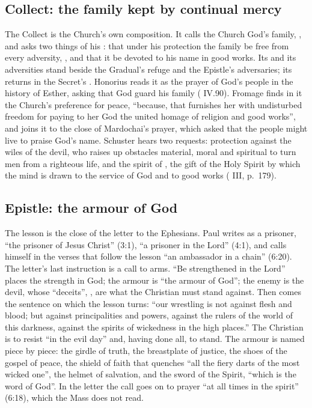 \subsection{Collect: the family kept by continual mercy}

The Collect is the Church's own composition. It calls the Church God's family,
, and asks two things of his : that
under his protection the family be free from every adversity, , and that it be devoted to his name in good works. Its
 and its adversities stand beside the Gradual's refuge and
the Epistle's adversaries; its  returns in the Secret's
. Honorius reads it as the prayer of God's people in the
history of Esther, asking that God guard his family (
IV.90). Fromage finds in it the Church's preference for peace, ``because, that
furnishes her with undisturbed freedom for paying to her God the united homage of
religion and good works'', and joins it to the close of Mardochai's prayer,
which asked that the people might live to praise God's name. Schuster hears two
requests: protection against the wiles of the devil, who raises up obstacles
material, moral and spiritual to turn men from a righteous life, and the spirit
of , the gift of the Holy Spirit by which the mind is drawn to the
service of God and to good works ( III, p.~179).

\subsection{Epistle: the armour of God}

The lesson is the close of the letter to the Ephesians. Paul writes as a
prisoner, ``the prisoner of Jesus Christ'' (3:1), ``a prisoner in the Lord''
(4:1), and calls himself in
the verses that follow the lesson ``an ambassador in a chain'' (6:20). The
letter's last instruction is a call to arms. ``Be strengthened in the Lord''
places the strength in God; the armour is ``the armour of God''; the enemy is the
devil, whose ``deceits'', , are what the Christian must stand
against. Then comes the sentence on which the lesson turns: ``our wrestling is
not against flesh and blood; but against principalities and powers, against the
rulers of the world of this darkness, against the spirits of wickedness in the
high places.'' The Christian is to resist ``in the evil day'' and, having done
all, to stand. The armour is named piece by piece: the girdle of truth, the
breastplate of justice, the shoes of the gospel of peace, the shield of faith
that quenches ``all the fiery darts of the most wicked one'', the helmet of
salvation, and the sword of the Spirit, ``which is the word of God''. In the
letter the call goes on to prayer ``at all times in the spirit'' (6:18), which
the Mass does not read.

